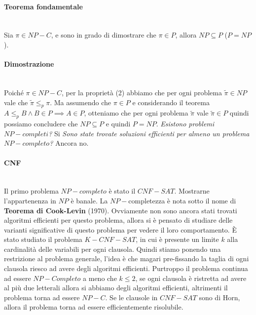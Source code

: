 \documentclass{article}
\begin{document}
\paragraph{Teorema fondamentale}\mbox{}\\
Sia $\pi\in NP-C$, e sono in grado di dimostrare che $\pi\in P$, allora $NP\subseteq P$ ($P=NP$).

\paragraph{Dimostrazione}\mbox{}\\
Poiché $\pi\in NP-C$, per la proprietà (2) abbiamo che per ogni problema $\tilde{\pi}\in NP$
vale che $\tilde{\pi}\leq_p\pi$. Ma assumendo che $\pi\in P$ e considerando il teorema
$A\leq_p B\land B\in P\implies A\in P$, otteniamo che per ogni problema $\tilde{\pi}$
vale $\tilde{\pi}\in P$ quindi possiamo concludere che $NP\subseteq P$ e quindi $P=NP$.
\textit{Esistono problemi $NP-completi$?} Si \textit{Sono state trovate soluzioni
    efficienti per almeno un problema $NP-completo$?} Ancora no.
\paragraph{CNF}\mbox{}\\
Il primo problema $NP-completo$ è stato il $CNF-SAT$. Mostrarne l'appartenenza in $NP$
è banale. La $NP-$completezza è nota sotto il nome di \textbf{Teorema di Cook-Levin} (1970).
Ovviamente non sono ancora stati trovati algoritmi efficienti per questo problema,
allora si è pensato di studiare delle varianti significative di questo problema
per vedere il loro comportamento.
\newline\newline
È stato studiato il problema $K-CNF-SAT$, in cui è presente un limite $k$ alla cardinalità
delle variabili per ogni clausola. Quindi stiamo ponendo una restrizione al problema
generale, l'idea è che magari pre-fissando la taglia di ogni clausola riesco ad avere
degli algoritmi efficienti. Purtroppo il problema continua ad essere $NP-Completo$ a meno
che $k\leq 2$, se ogni clausola è ristretta ad avere al più due letterali allora si abbiamo
degli algoritmi efficienti, altrimenti il problema torna ad essere $NP-C$.
\newline\newline
Se le clausole in $CNF-SAT$ sono di Horn, allora il problema torna ad essere efficientemente
risolubile.
\end{document}
